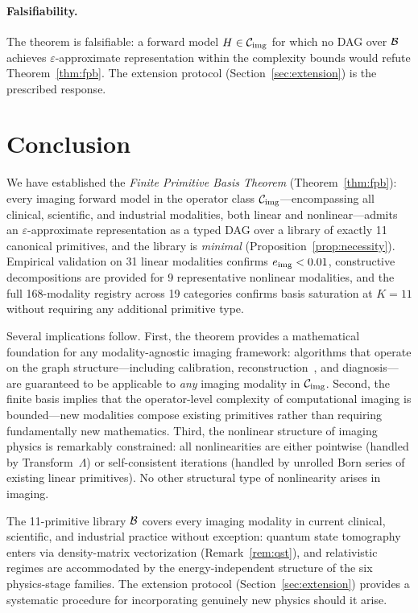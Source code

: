 \documentclass[11pt]{article}
\begin{document}
\paragraph{Falsifiability.}
The theorem is falsifiable: a forward model $H \in \mathcal{C}_{\mathrm{img}}$ for which no DAG over $\mathcal{B}$ achieves $\varepsilon$-approximate representation within the complexity bounds would refute Theorem~\ref{thm:fpb}. The extension protocol (Section~\ref{sec:extension}) is the prescribed response.


\section{Conclusion}
\label{sec:conclusion}

We have established the \emph{Finite Primitive Basis Theorem} (Theorem~\ref{thm:fpb}): every imaging forward model in the operator class $\mathcal{C}_{\mathrm{img}}$---encompassing all clinical, scientific, and industrial modalities, both linear and nonlinear---admits an $\varepsilon$-approximate representation as a typed DAG over a library of exactly 11 canonical primitives, and the library is \emph{minimal} (Proposition~\ref{prop:necessity}). Empirical validation on 31 linear modalities confirms $e_{\mathrm{img}} < 0.01$, constructive decompositions are provided for 9 representative nonlinear modalities, and the full 168-modality registry across 19 categories confirms basis saturation at $K = 11$ without requiring any additional primitive type.

Several implications follow. First, the theorem provides a mathematical foundation for any modality-agnostic imaging framework: algorithms that operate on the graph structure---including calibration, reconstruction~\cite{venkatakrishnan2013pnp,monga2021unrolling}, and diagnosis---are guaranteed to be applicable to \emph{any} imaging modality in $\mathcal{C}_{\mathrm{img}}$. Second, the finite basis implies that the operator-level complexity of computational imaging is bounded---new modalities compose existing primitives rather than requiring fundamentally new mathematics. Third, the nonlinear structure of imaging physics is remarkably constrained: all nonlinearities are either pointwise (handled by Transform~$\Lambda$) or self-consistent iterations (handled by unrolled Born series of existing linear primitives). No other structural type of nonlinearity arises in imaging.

The 11-primitive library $\mathcal{B}$ covers every imaging modality in current clinical, scientific, and industrial practice without exception: quantum state tomography enters via density-matrix vectorization (Remark~\ref{rem:qst}), and relativistic regimes are accommodated by the energy-independent structure of the six physics-stage families. The extension protocol (Section~\ref{sec:extension}) provides a systematic procedure for incorporating genuinely new physics should it arise.
\end{document}
